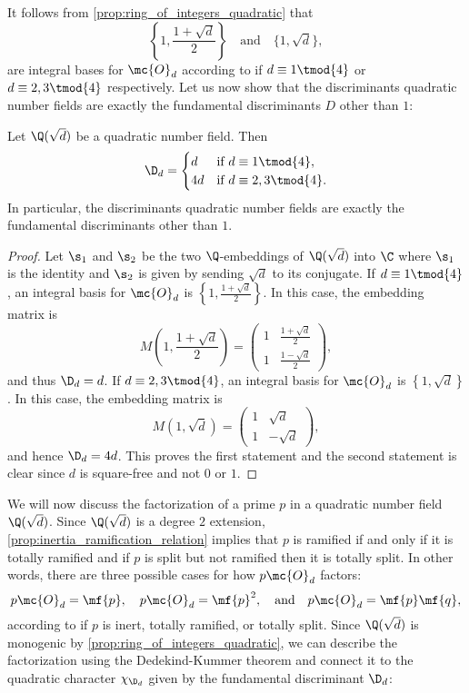     It follows from \cref{prop:ring_of_integers_quadratic} that
    \[
      \left\{1,\frac{1+\sqrt{d}}{2}\right\} \quad \text{and} \quad \{1,\sqrt{d}\},
    \]
    are integral bases for $\mc{O}_{d}$ according to if $d \equiv 1 \tmod{4}$ or $d \equiv 2,3 \tmod{4}$ respectively. Let us now show that the discriminants quadratic number fields are exactly the fundamental discriminants $D$ other than $1$:

    \begin{proposition}\label{prop:discriminant_quadratic}
      Let $\Q(\sqrt{d})$ be a quadratic number field. Then
      \[
        \D_{d} = \begin{cases} d & \text{if $d \equiv 1 \tmod{4}$}, \\ 4d & \text{if $d \equiv 2,3 \tmod{4}$}. \end{cases}
      \]
      In particular, the discriminants quadratic number fields are exactly the fundamental discriminants other than $1$.
    \end{proposition}
    \begin{proof}
      Let $\s_{1}$ and $\s_{2}$ be the two $\Q$-embeddings of $\Q(\sqrt{d})$ into $\C$ where $\s_{1}$ is the identity and $\s_{2}$ is given by sending $\sqrt{d}$ to its conjugate. If $d \equiv 1 \tmod{4}$, an integral basis for $\mc{O}_{d}$ is $\left\{1,\frac{1+\sqrt{d}}{2}\right\}$. In this case, the embedding matrix is
      \[
        M\left(1,\frac{1+\sqrt{d}}{2}\right) = \begin{pmatrix} 1 & \frac{1+\sqrt{d}}{2} \\ 1 & \frac{1-\sqrt{d}}{2} \end{pmatrix},
      \]
      and thus $\D_{d} = d$. If $d \equiv 2,3 \tmod{4}$, an integral basis for $\mc{O}_{d}$ is $\left\{1,\sqrt{d}\right\}$. In this case, the embedding matrix is
      \[
        M(1,\sqrt{d}) = \begin{pmatrix} 1 & \sqrt{d} \\ 1 & -\sqrt{d} \end{pmatrix},
      \]
      and hence $\D_{d} = 4d$. This proves the first statement and the second statement is clear since $d$ is square-free and not $0$ or $1$.
    \end{proof}

    We will now discuss the factorization of a prime $p$ in a quadratic number field $\Q(\sqrt{d})$. Since $\Q(\sqrt{d})$ is a degree $2$ extension, \cref{prop:inertia_ramification_relation} implies that $p$ is ramified if and only if it is totally ramified and if $p$ is split but not ramified then it is totally split. In other words, there are three possible cases for how $p\mc{O}_{d}$ factors:
    \[
      p\mc{O}_{d} = \mf{p}, \quad p\mc{O}_{d} = \mf{p}^{2}, \quad \text{and} \quad p\mc{O}_{d} = \mf{p}\mf{q},
    \]
    according to if $p$ is inert, totally ramified, or totally split. Since $\Q(\sqrt{d})$ is monogenic by \cref{prop:ring_of_integers_quadratic}, we can describe the factorization using the Dedekind-Kummer theorem and connect it to the quadratic character $\chi_{\D_{d}}$ given by the fundamental discriminant $\D_{d}$:

